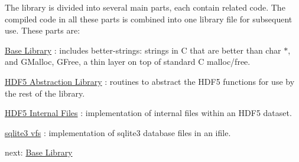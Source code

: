 The library is divided into several main parts, each contain related code. The compiled code in all these parts is combined into one library file for subsequent use. These parts are\+:

\begin{DoxyItemize}
\item \hyperlink{base_library}{Base Library} \+: includes better-\/strings\+: strings in C that are better than char $\ast$, and G\+Malloc, G\+Free, a thin layer on top of standard C malloc/free. \item \hyperlink{hdf_library}{H\+D\+F5 Abstraction Library} \+: routines to abstract the H\+D\+F5 functions for use by the rest of the library. \item \hyperlink{ifile_library}{H\+D\+F5 Internal Files} \+: implementation of internal files within an H\+D\+F5 dataset. \item \hyperlink{vfs_library}{sqlite3 vfs} \+: implementation of sqlite3 database files in an ifile.\end{DoxyItemize}
next\+: \hyperlink{base_library}{Base Library} 